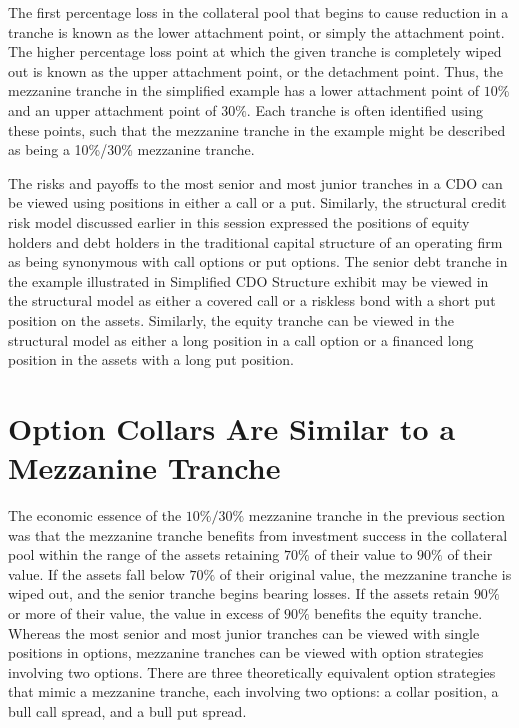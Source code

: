 \documentclass[11pt]{article}
\begin{document}
The first percentage loss in the collateral pool that begins to cause reduction in a tranche is known as the lower attachment point, or simply the attachment point. The higher percentage loss point at which the given tranche is completely wiped out is known as the upper attachment point, or the detachment point. Thus, the mezzanine tranche in the simplified example has a lower attachment point of $10 \%$ and an upper attachment point of $30 \%$. Each tranche is often identified using these points, such that the mezzanine tranche in the example might be described as being a 10\%/30\% mezzanine tranche.

The risks and payoffs to the most senior and most junior tranches in a CDO can be viewed using positions in either a call or a put. Similarly, the structural credit risk model discussed earlier in this session expressed the positions of equity holders and debt holders in the traditional capital structure of an operating firm as being synonymous with call options or put options. The senior debt tranche in the example illustrated in Simplified CDO Structure exhibit may be viewed in the structural model as either a covered call or a riskless bond with a short put position on the assets. Similarly, the equity tranche can be viewed in the structural model as either a long position in a call option or a financed long position in the assets with a long put position.

\section*{Option Collars Are Similar to a Mezzanine Tranche}
The economic essence of the $10 \% / 30 \%$ mezzanine tranche in the previous section was that the mezzanine tranche benefits from investment success in the collateral pool within the range of the assets retaining $70 \%$ of their value to $90 \%$ of their value. If the assets fall below $70 \%$ of their original value, the mezzanine tranche is wiped out, and the senior tranche begins bearing losses. If the assets retain $90 \%$ or more of their value, the value in excess of $90 \%$ benefits the equity tranche. Whereas the most senior and most junior tranches can be viewed with single positions in options, mezzanine tranches can be viewed with option strategies involving two options. There are three theoretically equivalent option strategies that mimic a mezzanine tranche, each involving two options: a collar position, a bull call spread, and a bull put spread.
\end{document}

